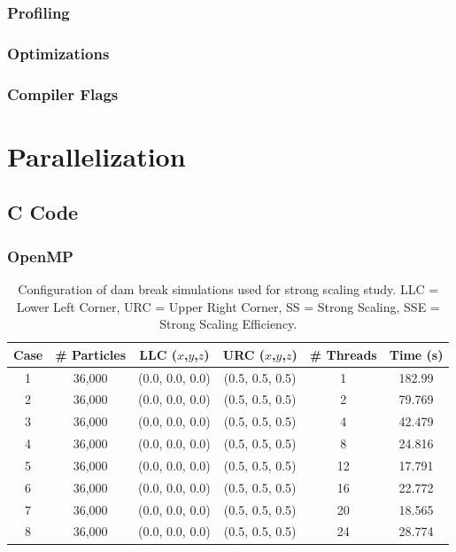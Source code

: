 \documentclass{scrartcl}
\begin{document}
  \subsubsection{Profiling}
  
  \subsubsection{Optimizations}
  \subsubsection{Compiler Flags}
  
    \section{Parallelization}
    \subsection{C Code}  
    \subsubsection{OpenMP}
    \begin{table}
    	\begin{center}
        \begin{tabular}{| c | c | c | c | c | c | }
            \hline
            Case & \# Particles & LLC ($x$,$y$,$z$) & URC ($x$,$y$,$z$) & \# Threads & Time (s) \\ \hline		  		
            1 & 36,000 & (0.0, 0.0, 0.0) & (0.5, 0.5, 0.5) &  1 & 182.99 \\ \hline		  		
            2 & 36,000 & (0.0, 0.0, 0.0) & (0.5, 0.5, 0.5) &  2 & 79.769 \\ \hline		  		
            3 & 36,000 & (0.0, 0.0, 0.0) & (0.5, 0.5, 0.5) &  4 & 42.479 \\ \hline		  		
            4 & 36,000 & (0.0, 0.0, 0.0) & (0.5, 0.5, 0.5) &  8 & 24.816 \\ \hline		  		
            5 & 36,000 & (0.0, 0.0, 0.0) & (0.5, 0.5, 0.5) & 12 & 17.791 \\ \hline		  		
            6 & 36,000 & (0.0, 0.0, 0.0) & (0.5, 0.5, 0.5) & 16 & 22.772 \\ \hline		  		
            7 & 36,000 & (0.0, 0.0, 0.0) & (0.5, 0.5, 0.5) & 20 & 18.565 \\ \hline		  		
            8 & 36,000 & (0.0, 0.0, 0.0) & (0.5, 0.5, 0.5) & 24 & 28.774 \\ \hline		  		
        \end{tabular}
        \caption{Configuration of dam break simulations used for strong scaling study. LLC = Lower Left Corner, URC = Upper Right Corner, SS = Strong Scaling, SSE = Strong Scaling Efficiency.}
        \label{tab:ss}
        \end{center}
    \end{table}
  
\end{document}
